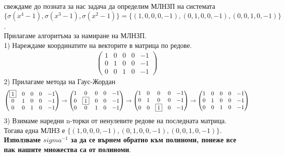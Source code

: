 \documentclass[a4paper, 12pt, oneside]{article}
\begin{document}
свеждаме до позната за нас задача да определим МЛНЗП на системата \\
\(\{\sigma(x^4 - 1), \sigma(x^3 - 1), \sigma(x^2 - 1)\} = \{(1, 0, 0, 0, -1), (0, 1, 0, 0, -1), (0, 0, 1, 0, -1)\}\). \\
Прилагаме алгоритъма за намиране на МЛНЗП. \\
1) Нареждаме координатите на векторите в матрица по редове. \\
\begin{align*}
    \begin{pmatrix}
        1 & 0 & 0 & 0 & -1 \\
        0 & 1 & 0 & 0 & -1 \\
        0 & 0 & 1 & 0 & -1
    \end{pmatrix}
\end{align*}
2) Прилагаме метода на Гаус-Жордан \\
\begin{align*}
    \begin{pmatrix}
        \fbox{1} & 0 & 0 & 0 & -1 \\
        0 & 1 & 0 & 0 & -1 \\
        0 & 0 & 1 & 0 & -1
    \end{pmatrix} \to \begin{pmatrix}
        1 & 0 & 0 & 0 & -1 \\
        0 & \fbox{1} & 0 & 0 & -1 \\
        0 & 0 & 1 & 0 & -1
    \end{pmatrix} \to \begin{pmatrix}
        1 & 0 & 0 & 0 & -1 \\
        0 & 1 & 0 & 0 & -1 \\
        0 & 0 & \fbox{1} & 0 & -1
    \end{pmatrix} \to \begin{pmatrix}
        1 & 0 & 0 & 0 & -1 \\
        0 & 1 & 0 & 0 & -1 \\
        0 & 0 & 1 & 0 & -1
    \end{pmatrix}
\end{align*}
3) Взимаме наредни n-торки от ненулевите редове на последната матрица. \\
Тогава една МЛНЗ е \(\{(1, 0, 0, 0, -1), (0, 1, 0, 0, -1), (0, 0, 1, 0, -1)\}\). \\
\textbf{Използваме \(sigma^{-1}\) за да се върнем обратно към полиноми, понеже все пак нашите множества са от полиноми}. \\
\end{document}
